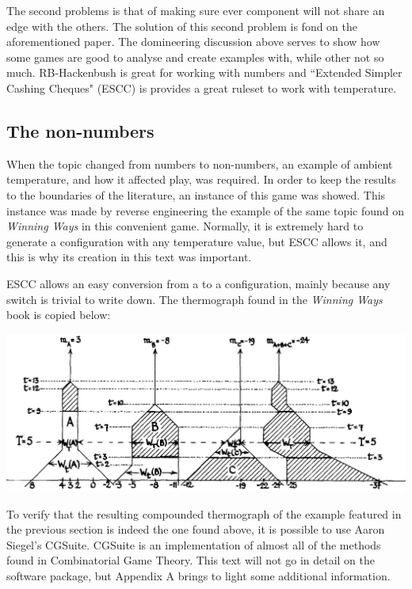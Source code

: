 The second problems is that of making sure ever component will not share an edge with the others. The solution of this second problem is fond on the aforementioned paper. The domineering discussion above serves to show how some games are good to analyse and create examples with, while other not so much. RB-Hackenbush is great for working with numbers and ``Extended Simpler Cashing Cheques" (ESCC) is provides a great ruleset to work with temperature. 

\subsection*{The non-numbers}

When the topic changed from numbers to non-numbers, an example of ambient temperature, and how it affected play, was required. In order to keep the results to the boundaries of the literature, an instance of this game was showed. This instance was made by reverse engineering the example of the same topic found on \textit{Winning Ways} \cite{WW} in this convenient game. Normally, it is extremely hard to generate a configuration with any temperature value, but ESCC allows it, and this is why its creation in this text was important.

ESCC allows an easy conversion from a  to a configuration, mainly because any switch is trivial to write down. The thermograph found in the \textit{Winning Ways} book is copied below:

\vspace{0.5cm}\hspace{-1.5cm}\includegraphics[scale=0.45]{../images/cpd_therm_ww.png}
\vspace{0.5cm}

To verify that the resulting compounded thermograph of the example featured in the previous section is indeed the one found above, it is possible to use Aaron Siegel's CGSuite. CGSuite is an implementation of almost all of the methods found in Combinatorial Game Theory. This text will not go in detail on the software package, but Appendix A brings to light some additional information.

